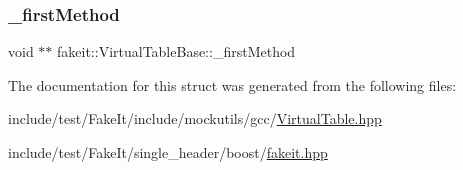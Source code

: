 \subsubsection{\texorpdfstring{\_firstMethod}{\_firstMethod}}
{\footnotesize\ttfamily void $\ast$$\ast$ fakeit\+::\+Virtual\+Table\+Base\+::\+\_\+first\+Method\hspace{0.3cm}{\ttfamily [protected]}}



The documentation for this struct was generated from the following files\+:\begin{DoxyCompactItemize}
\item 
include/test/\+Fake\+It/include/mockutils/gcc/\mbox{\hyperlink{gcc_2VirtualTable_8hpp}{Virtual\+Table.\+hpp}}\item 
include/test/\+Fake\+It/single\+\_\+header/boost/\mbox{\hyperlink{single__header_2boost_2fakeit_8hpp}{fakeit.\+hpp}}\end{DoxyCompactItemize}
